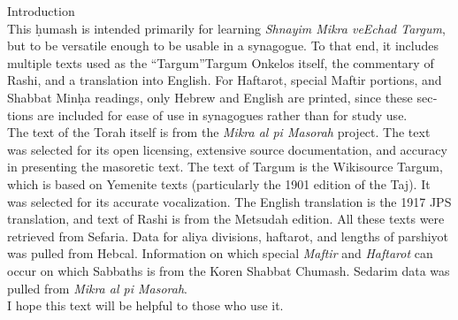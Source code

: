 \tableofcontents
\clearpage
{}	
\begin{minipage}{\textwidth}\englishfont
	
\begin{english}
\vspace{16pt}
\Large Introduction\vspace{12pt}\\
\normalsize
This \d{h}umash is intended primarily for learning \textit{Shnayim Mikra veEchad Targum}, but to be versatile enough to be usable in a synagogue. To that end, it includes multiple texts used as the “Targum”\textemdash Targum Onkelos itself, the commentary of Rashi, and a translation into English.  For Haftarot, special Maftir portions, and Shabbat Min\d{h}a readings, only Hebrew and English are printed, since these sections are included for ease of use in synagogues rather than for study use.\\

The text of the Torah itself is from the \textit{Mikra al pi Masorah} project. The text was selected for its open licensing, extensive source documentation, and accuracy in presenting the masoretic text.  The text of Targum is the Wikisource Targum, which is based on Yemenite texts (particularly the 1901 edition of the Taj). It was selected for its accurate vocalization.
The English translation is the 1917 JPS translation, and text of Rashi is from the Metsudah edition.  All these texts were retrieved from Sefaria. Data for aliya divisions, haftarot, and lengths of parshiyot was pulled from Hebcal. Information on which special \textit{Maftir} and \textit{Haftarot} can occur on which Sabbaths is from the Koren Shabbat Chumash. Sedarim data was pulled from \textit{Mikra al pi Masorah}.\\

I hope this text will be helpful to those who use it.

\end{english}

\end{minipage}

